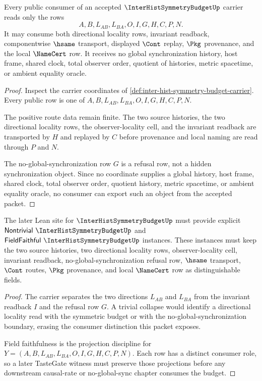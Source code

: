 \begin{theorem}
\label{thm:inter-hist-symmetry-budget-nonescape}
Every public consumer of an accepted $\InterHistSymmetryBudgetUp$ carrier reads only the rows
$$
A,B,L_{AB},L_{BA},O,I,G,H,C,P,N.
$$
It may consume both directional locality rows, invariant readback, componentwise $\hsame$ transport, displayed $\Cont$ replay, $\Pkg$ provenance, and the local $\NameCert$ row. It receives no global synchronization history, host frame, shared clock, total observer order, quotient of histories, metric spacetime, or ambient equality oracle.
\end{theorem}
\begin{proof}
Inspect the carrier coordinates of \autoref{def:inter-hist-symmetry-budget-carrier}. Every public row is one of $A,B,L_{AB},L_{BA},O,I,G,H,C,P,N$.

The positive route data remain finite. The two source histories, the two directional locality rows, the observer-locality cell, and the invariant readback are transported by $H$ and replayed by $C$ before provenance and local naming are read through $P$ and $N$.

The no-global-synchronization row $G$ is a refusal row, not a hidden synchronization object. Since no coordinate supplies a global history, host frame, shared clock, total observer order, quotient history, metric spacetime, or ambient equality oracle, no consumer can export such an object from the accepted packet.
\end{proof}

\begin{theorem}
\label{thm:inter-hist-symmetry-budget-tastegate-obligation}
The later Lean site for $\InterHistSymmetryBudgetUp$ must provide explicit $\mathsf{Nontrivial}\ \InterHistSymmetryBudgetUp$ and $\mathsf{FieldFaithful}\ \InterHistSymmetryBudgetUp$ instances. These instances must keep the two source histories, two directional locality rows, observer-locality cell, invariant readback, no-global-synchronization refusal row, $\hsame$ transport, $\Cont$ routes, $\Pkg$ provenance, and local $\NameCert$ row as distinguishable fields.
\end{theorem}
\begin{proof}
The carrier separates the two directions $L_{AB}$ and $L_{BA}$ from the invariant readback $I$ and the refusal row $G$. A trivial collapse would identify a directional locality read with the symmetric budget or with the no-global-synchronization boundary, erasing the consumer distinction this packet exposes.

Field faithfulness is the projection discipline for $Y=(A,B,L_{AB},L_{BA},O,I,G,H,C,P,N)$. Each row has a distinct consumer role, so a later TasteGate witness must preserve those projections before any downstream causal-rate or no-global-sync chapter consumes the budget.
\end{proof}

